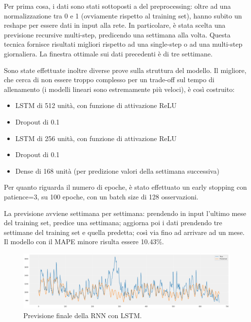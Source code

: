 Per prima cosa, i dati sono stati sottoposti a del preprocessing: oltre ad una normalizzazione tra 0 e 1 (ovviamente rispetto al training set), hanno subito un reshape per essere dati in input alla rete. In particolare, è stata scelta una previsione recursive multi-step, predicendo una settimana alla volta. Questa tecnica fornisce risultati migliori rispetto ad una single-step o ad una multi-step giornaliera. La finestra ottimale sui dati precedenti è di tre settimane.

Sono state effettuate inoltre diverse prove sulla struttura del modello. Il migliore, che cerca di non essere troppo complesso per un trade-off sul tempo di allenamento (i modelli lineari sono estremamente più veloci), è così costruito: 
\begin{itemize}
    \item LSTM di 512 unità, con funzione di attivazione ReLU
    \item Dropout di 0.1
    \item LSTM di 256 unità, con funzione di attivazione ReLU
    \item Dropout di 0.1
    \item Dense di 168 unità (per predizione valori della settimana successiva)
\end{itemize}

Per quanto riguarda il numero di epoche, è stato effettuato un early stopping con patience=3, su 100 epoche, con un batch size di 128 osservazioni.

La previsione avviene settimana per settimana: prendendo in input l'ultimo mese del training set, predice una settimana; aggiorna poi i dati prendendo tre settimane del training set e quella predetta; così via fino ad arrivare ad un mese. Il modello con il MAPE minore risulta essere 10.43\%.

\begin{figure}[H]
\centering
\includegraphics[width=14cm]{Pictures/prediction_lstm.png}
\caption{Previsione finale della RNN con LSTM.}
\end{figure}




